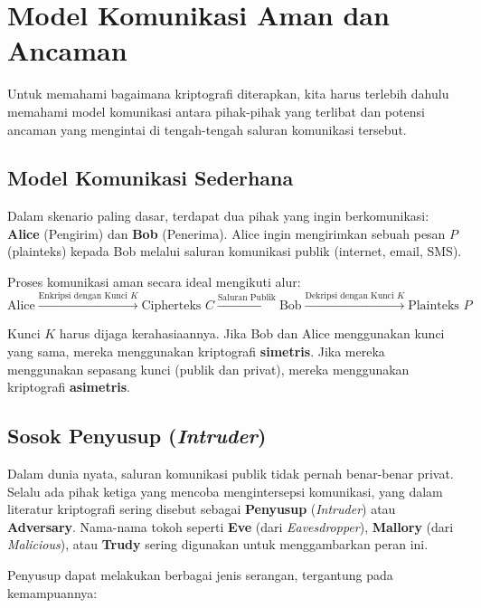 \section{Model Komunikasi Aman dan Ancaman}

Untuk memahami bagaimana kriptografi diterapkan, kita harus terlebih dahulu memahami model komunikasi antara pihak-pihak yang terlibat dan potensi ancaman yang mengintai di tengah-tengah saluran komunikasi tersebut.

\subsection{Model Komunikasi Sederhana}

Dalam skenario paling dasar, terdapat dua pihak yang ingin berkomunikasi: \textbf{Alice} (Pengirim) dan \textbf{Bob} (Penerima). Alice ingin mengirimkan sebuah pesan $P$ (plainteks) kepada Bob melalui saluran komunikasi publik (internet, email, SMS).

Proses komunikasi aman secara ideal mengikuti alur:
\[ \text{Alice} \xrightarrow{\text{Enkripsi dengan Kunci } K} \text{Cipherteks } C \xrightarrow{\text{Saluran Publik}} \text{Bob} \xrightarrow{\text{Dekripsi dengan Kunci } K} \text{Plainteks } P \]

Kunci $K$ harus dijaga kerahasiaannya. Jika Bob dan Alice menggunakan kunci yang sama, mereka menggunakan kriptografi \textbf{simetris}. Jika mereka menggunakan sepasang kunci (publik dan privat), mereka menggunakan kriptografi \textbf{asimetris}.

\subsection{Sosok Penyusup (\textit{Intruder})}

Dalam dunia nyata, saluran komunikasi publik tidak pernah benar-benar privat. Selalu ada pihak ketiga yang mencoba mengintersepsi komunikasi, yang dalam literatur kriptografi sering disebut sebagai \textbf{Penyusup} (\textit{Intruder}) atau \textbf{Adversary}. Nama-nama tokoh seperti \textbf{Eve} (dari \textit{Eavesdropper}), \textbf{Mallory} (dari \textit{Malicious}), atau \textbf{Trudy} sering digunakan untuk menggambarkan peran ini.

Penyusup dapat melakukan berbagai jenis serangan, tergantung pada kemampuannya:

